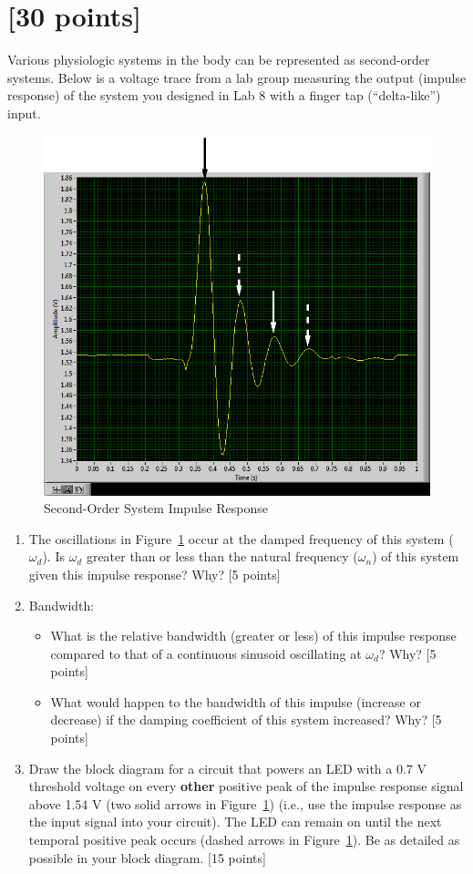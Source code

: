 

\section{[30 points]}

Various physiologic systems in the body can be represented as second-order
systems.  Below is a voltage trace from a lab group measuring the output
(impulse response) of the system you designed in Lab 8 with a finger tap
(``delta-like'') input.

\begin{figure}[htb!]
\centering
\includegraphics[width=0.5\linewidth]{impresp.png}
\caption{Second-Order System Impulse Response}
\label{fig:impresp}
\end{figure}

\begin{enumerate}

\item The oscillations in Figure~\ref{fig:impresp} occur at the damped
frequency of this system ($\omega_d$).  Is $\omega_d$ greater than or less than
the natural frequency ($\omega_n$) of this system given this impulse response?
Why? [5 points]

\item Bandwidth:
\begin{itemize}
    \item What is the relative bandwidth (greater or less) of this impulse
response compared to that of a continuous sinusoid oscillating at $\omega_d$?
Why? [5 points]
    \item What would happen to the bandwidth of this impulse (increase or decrease) if the damping coefficient of this system increased?  Why?  [5 points]
\end{itemize}

\item Draw the block diagram for a circuit that powers an LED with a 0.7 V
threshold voltage on every {\bf other} positive peak of the impulse response
signal above 1.54 V (two solid arrows in Figure~\ref{fig:impresp}) (i.e., use
the impulse response as the input signal into your circuit).  The LED can
remain on until the next temporal positive peak occurs (dashed arrows in
Figure~\ref{fig:impresp}).  Be as detailed as possible in your block diagram.
[15 points]

\end{enumerate}

\clearpage



\clearpage



\clearpage



\clearpage

